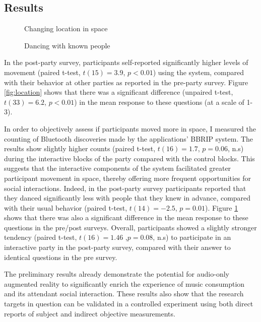 \documentclass[a4paper,11pt]{article}
\begin{document}
{\subsection{Results}

\begin{figure}[!htb]
	\def\svgwidth{0.95\columnwidth}
  	
	\caption{Changing location in space}\label{fig:location}
\endminipage\hfill
{}
	\def\svgwidth{0.95\columnwidth}
	
	\caption{Dancing with known people}\label{fig:known}
\endminipage\hfill
\end{figure}

In the post-party survey, participants self-reported significantly higher levels of movement (paired t-test, $t(15)=3.9$, $p<0.01$) using the system, compared with their behavior at other parties as reported in the pre-party survey.
Figure \ref{fig:location} shows that there was a significant difference (unpaired t-test, $t(33)=6.2$, $p<0.01$) in the mean response to these questions (at a scale of 1-3).

In order to objectively assess if participants moved more in space, I measured the counting of Bluetooth discoveries made by the applications' BBRIP system.
The results show slightly higher counts (paired t-test, $t(16)=1.7$, $p=0.06$, n.s) during the interactive blocks of the party compared with the control blocks.
This suggests that the interactive components of the system facilitated greater participant movement in space, thereby offering more frequent opportunities for social interactions.
Indeed, in the post-party survey participants reported that they danced significantly less with people that they knew in advance, compared with their usual behavior (paired t-test, $t(14)=-2.5$, $p=0.01$).
Figure \ref{fig:known} shows that there was also a significant difference in the mean response to these questions in the pre/post surveys.
Overall, participants showed a slightly stronger tendency (paired t-test, $t(16)=1.46$ ,$p=0.08$, n.s) to participate in an interactive party in the post-party survey, compared with their answer to identical questions in the pre survey.

The preliminary results already demonstrate the potential for audio-only augmented reality to significantly enrich the experience of music consumption and its attendant social interaction.
These results also show that the research targets in question can be validated in a controlled experiment using both direct reports of subject and indirect objective measurements.

}
\end{document}
